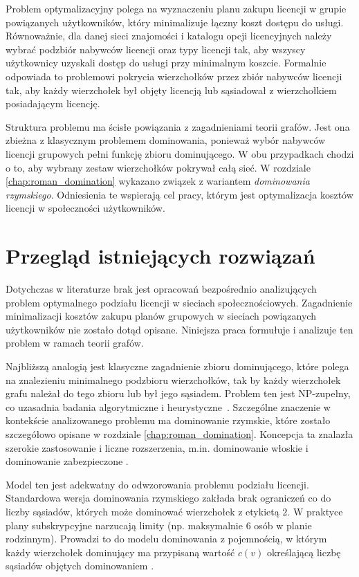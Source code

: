 Problem optymalizacyjny polega na wyznaczeniu planu zakupu licencji w grupie powiązanych użytkowników, który minimalizuje łączny koszt dostępu do usługi. Równoważnie, dla danej sieci znajomości i katalogu opcji licencyjnych należy wybrać podzbiór nabywców licencji oraz typy licencji tak, aby wszyscy użytkownicy uzyskali dostęp do usługi przy minimalnym koszcie. Formalnie odpowiada to problemowi pokrycia wierzchołków przez zbiór nabywców licencji tak, aby każdy wierzchołek był objęty licencją lub sąsiadował z wierzchołkiem posiadającym licencję.

Struktura problemu ma ścisłe powiązania z zagadnieniami teorii grafów. Jest ona zbieżna z klasycznym problemem dominowania, ponieważ wybór nabywców licencji grupowych pełni funkcję zbioru dominującego. W obu przypadkach chodzi o to, aby wybrany zestaw wierzchołków pokrywał całą sieć. W rozdziale \ref{chap:roman_domination} wykazano związek z wariantem \emph{dominowania rzymskiego}. Odniesienia te wspierają cel pracy, którym jest optymalizacja kosztów licencji w społeczności użytkowników.

\section{Przegląd istniejących rozwiązań}

Dotychczas w literaturze brak jest opracowań bezpośrednio analizujących problem optymalnego podziału licencji w sieciach społecznościowych. Zagadnienie minimalizacji kosztów zakupu planów grupowych w sieciach powiązanych użytkowników nie zostało dotąd opisane. Niniejsza praca formułuje i analizuje ten problem w ramach teorii grafów.

Najbliższą analogią jest klasyczne zagadnienie zbioru dominującego, które polega na znalezieniu minimalnego podzbioru wierzchołków, tak by każdy wierzchołek grafu należał do tego zbioru lub był jego sąsiadem. Problem ten jest NP-zupełny, co uzasadnia badania algorytmiczne i heurystyczne~\cite{garey1979}. Szczególne znaczenie w kontekście analizowanego problemu ma dominowanie rzymskie, które zostało szczegółowo opisane w rozdziale \ref{chap:roman_domination}. Koncepcja ta znalazła szerokie zastosowanie i liczne rozszerzenia, m.in. dominowanie włoskie i dominowanie zabezpieczone \cite{Roman2DominationSurvey}.

Model ten jest adekwatny do odwzorowania problemu podziału licencji. Standardowa wersja dominowania rzymskiego zakłada brak ograniczeń co do liczby sąsiadów, których może dominować wierzchołek z etykietą $2$. W praktyce plany subskrypcyjne narzucają limity (np. maksymalnie $6$ osób w planie rodzinnym). Prowadzi to do modelu dominowania z pojemnością, w którym każdy wierzchołek dominujący ma przypisaną wartość $c(v)$ określającą liczbę sąsiadów objętych dominowaniem \cite{CapDom}.

